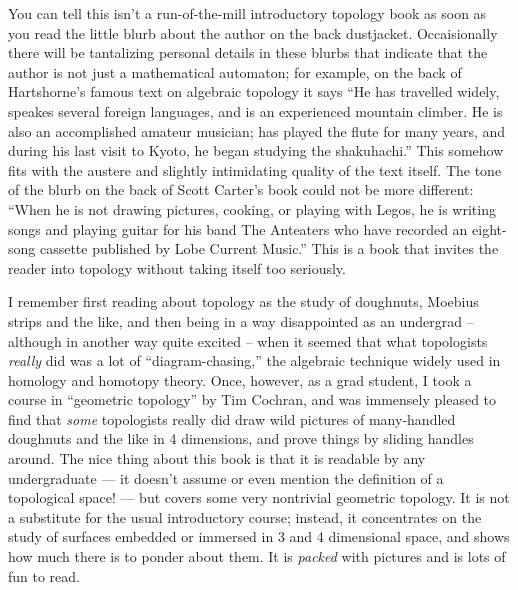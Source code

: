 \documentclass[12pt]{article}
\begin{document}
You can tell this isn't a run-of-the-mill introductory topology book as
soon as you read the little blurb about the author on the back
dustjacket. Occaisionally there will be tantalizing personal details in
these blurbs that indicate that the author is not just a mathematical
automaton; for example, on the back of Hartshorne's famous text on
algebraic topology it says ``He has travelled widely, speakes several
foreign languages, and is an experienced mountain climber. He is also an
accomplished amateur musician; has played the flute for many years, and
during his last visit to Kyoto, he began studying the shakuhachi.'' This
somehow fits with the austere and slightly intimidating quality of the
text itself. The tone of the blurb on the back of Scott Carter's book
could not be more different: ``When he is not drawing pictures, cooking,
or playing with Legos, he is writing songs and playing guitar for his
band The Anteaters who have recorded an eight-song cassette published by
Lobe Current Music.'' This is a book that invites the reader into
topology without taking itself too seriously.

I remember first reading about topology as the study of doughnuts,
Moebius strips and the like, and then being in a way disappointed as an
undergrad -- although in another way quite excited -- when it seemed
that what topologists \emph{really} did was a lot of
``diagram-chasing,'' the algebraic technique widely used in homology and
homotopy theory. Once, however, as a grad student, I took a course in
``geometric topology'' by Tim Cochran, and was immensely pleased to find
that \emph{some} topologists really did draw wild pictures of
many-handled doughnuts and the like in 4 dimensions, and prove things by
sliding handles around. The nice thing about this book is that it is
readable by any undergraduate --- it doesn't assume or even mention the
definition of a topological space! --- but covers some very nontrivial
geometric topology. It is not a substitute for the usual introductory
course; instead, it concentrates on the study of surfaces embedded or
immersed in 3 and 4 dimensional space, and shows how much there is to
ponder about them. It is \emph{packed} with pictures and is lots of fun
to read.
\end{document}
